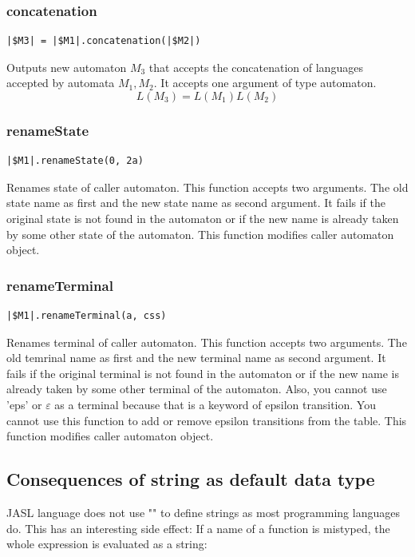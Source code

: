 \documentclass{ctuthesis}
\begin{document}
\subsubsection{concatenation}
\begin{lstlisting}[language = JASL_snippet]
	|$M3| = |$M1|.concatenation(|$M2|)
\end{lstlisting}

Outputs new automaton $M_3$ that accepts the concatenation of languages accepted by automata $M_1, M_2$. It accepts one argument of type automaton.
\begin{equation*}
	L(M_3) = L(M_1)L(M_2)
\end{equation*}


\subsubsection{renameState}
\begin{lstlisting}[language = JASL_snippet]
	|$M1|.renameState(0, 2a)
\end{lstlisting}

Renames state of caller automaton. This function accepts two arguments. The old state name as first and the new state name as second argument. It fails if the original state is not found in the automaton or if the new name is already taken by some other state of the automaton. This function modifies caller automaton object.


\subsubsection{renameTerminal}
 \begin{lstlisting}[language = JASL_snippet]
	|$M1|.renameTerminal(a, css)
\end{lstlisting}

Renames terminal of caller automaton. This function accepts two arguments. The old temrinal name as first and the new terminal name as second argument. It fails if the original terminal is not found in the automaton or if the new name is already taken by some other terminal of the automaton. Also, you cannot use 'eps' or $\varepsilon$ as a terminal because that is a keyword of epsilon transition. You cannot use this function to add or remove epsilon transitions from the table. This function modifies caller automaton object.

\subsection{Consequences of string as default data type}
JASL language does not use "" to define strings as most programming languages do. This has an interesting side effect: If a name of a function is mistyped, the whole expression is evaluated as a string:
\end{document}
